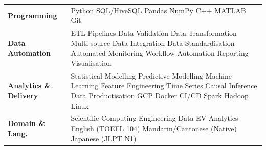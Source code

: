 \documentclass[a4paper,10pt]{article}
\begin{document}
\begin{tabular}{@{}p{3.0cm}p{12.5cm}@{}}
\textbf{Programming} & Python \textperiodcentered{} SQL/HiveSQL \textperiodcentered{} Pandas \textperiodcentered{} NumPy \textperiodcentered{} C++ \textperiodcentered{} MATLAB \textperiodcentered{} Git \\[1pt]
\textbf{Data Automation} & ETL Pipelines \textperiodcentered{} Data Validation \textperiodcentered{} Data Transformation \textperiodcentered{} Multi-source Data Integration \textperiodcentered{} Data Standardisation \textperiodcentered{} Automated Monitoring \textperiodcentered{} Workflow Automation \textperiodcentered{} Reporting \textperiodcentered{} Visualisation \\[1pt]
\textbf{Analytics \& Delivery} & Statistical Modelling \textperiodcentered{} Predictive Modelling \textperiodcentered{} Machine Learning \textperiodcentered{} Feature Engineering \textperiodcentered{} Time Series \textperiodcentered{} Causal Inference \textperiodcentered{} Data Productisation \textperiodcentered{} GCP \textperiodcentered{} Docker \textperiodcentered{} CI/CD \textperiodcentered{} Spark \textperiodcentered{} Hadoop \textperiodcentered{} Linux \\[1pt]
\textbf{Domain \& Lang.} & Scientific Computing \textperiodcentered{} Engineering Data \textperiodcentered{} EV Analytics \textperiodcentered{} English (TOEFL 104) \textperiodcentered{} Mandarin/Cantonese (Native) \textperiodcentered{} Japanese (JLPT N1) \\
\end{tabular}
\end{document}
